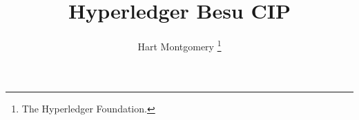 \documentclass[letterpaper,10pt]{article}
\title{\Large{\textbf{Hyperledger Besu CIP}}}
\author{%
  Hart Montgomery \footnote{The Hyperledger Foundation.}
}
\begin{document}
\date{}
\maketitle 

%  





	




\end{document}
